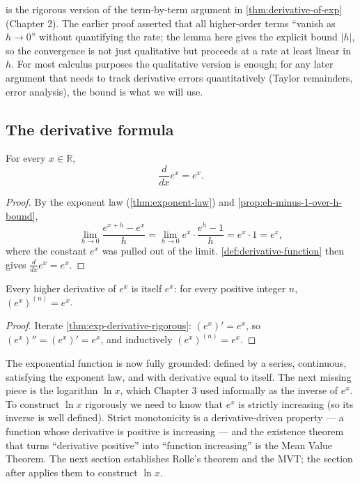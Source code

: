 \begin{caution}
 is the rigorous version of the term-by-term argument in \cref{thm:derivative-of-exp} (Chapter 2). The earlier proof asserted that all higher-order terms ``vanish as \(h \to 0\)'' without quantifying the rate; the lemma here gives the explicit bound \(\lvert h \rvert\), so the convergence is not just qualitative but proceeds at a rate at least linear in \(h\). For most calculus purposes the qualitative version is enough; for any later argument that needs to track derivative errors quantitatively (Taylor remainders, error analysis), the bound is what we will use.
\end{caution}

\subsection{The derivative formula}

\begin{theorem}\label{thm:exp-derivative-rigorous}
For every \(x \in \mathbb{R}\),
\[
\frac{d}{dx} e^{x} = e^{x}.
\]
\end{theorem}

\begin{proof}
By the exponent law (\cref{thm:exponent-law}) and \cref{prop:eh-minus-1-over-h-bound},
\[
\lim_{h \to 0} \frac{e^{x + h} - e^{x}}{h}
= \lim_{h \to 0} e^{x} \cdot \frac{e^{h} - 1}{h}
= e^{x} \cdot 1
= e^{x},
\]
where the constant \(e^{x}\) was pulled out of the limit. \cref{def:derivative-function} then gives \(\frac{d}{dx} e^{x} = e^{x}\).
\end{proof}

\begin{corollary}\label{cor:exp-higher-derivatives}
Every higher derivative of \(e^{x}\) is itself \(e^{x}\): for every positive integer \(n\), \((e^{x})^{(n)} = e^{x}\).
\end{corollary}

\begin{proof}
Iterate \cref{thm:exp-derivative-rigorous}: \((e^{x})' = e^{x}\), so \((e^{x})'' = (e^{x})' = e^{x}\), and inductively \((e^{x})^{(n)} = e^{x}\).
\end{proof}

The exponential function is now fully grounded: defined by a series, continuous, satisfying the exponent law, and with derivative equal to itself. The next missing piece is the logarithm \(\ln x\), which Chapter 3 used informally as the inverse of \(e^{x}\). To construct \(\ln x\) rigorously we need to know that \(e^{x}\) is strictly increasing (so its inverse is well defined). Strict monotonicity is a derivative-driven property --- a function whose derivative is positive is increasing --- and the existence theorem that turns ``derivative positive'' into ``function increasing'' is the Mean Value Theorem. The next section establishes Rolle's theorem and the MVT; the section after applies them to construct \(\ln x\).

